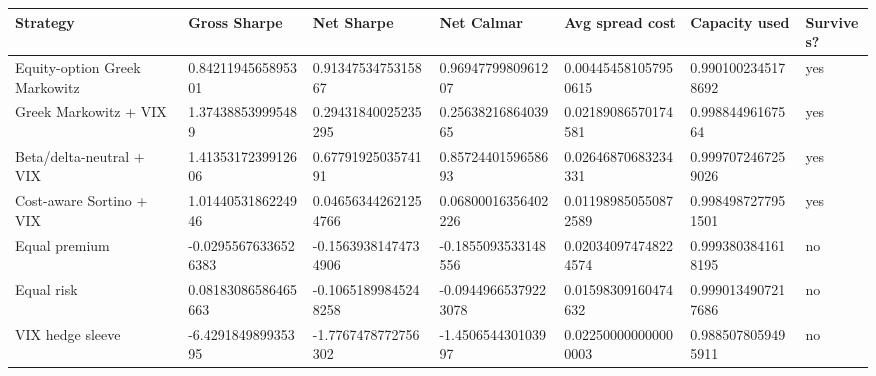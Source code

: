 \begin{tabular}{lllllll}
\toprule
Strategy & Gross Sharpe & Net Sharpe & Net Calmar & Avg spread cost & Capacity used & Survives? \\
\midrule
Equity-option Greek Markowitz & 0.8421194565895301 & 0.9134753475315867 & 0.9694779980961207 & 0.004454581057950615 & 0.9901002345178692 & yes \\
Greek Markowitz + VIX & 1.374388539995489 & 0.29431840025235295 & 0.2563821686403965 & 0.02189086570174581 & 0.99884496167564 & yes \\
Beta/delta-neutral + VIX & 1.4135317239912606 & 0.6779192503574191 & 0.8572440159658693 & 0.02646870683234331 & 0.9997072467259026 & yes \\
Cost-aware Sortino + VIX & 1.0144053186224946 & 0.046563442621254766 & 0.06800016356402226 & 0.011989850550872589 & 0.9984987277951501 & yes \\
Equal premium & -0.02955676336526383 & -0.15639381474734906 & -0.1855093533148556 & 0.020340974748224574 & 0.9993803841618195 & no \\
Equal risk & 0.08183086586465663 & -0.10651899845248258 & -0.09449665379223078 & 0.01598309160474632 & 0.9990134907217686 & no \\
VIX hedge sleeve & -6.429184989935395 & -1.7767478772756302 & -1.450654430103997 & 0.022500000000000003 & 0.9885078059495911 & no \\
\bottomrule
\end{tabular}
